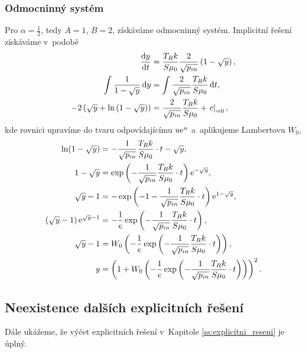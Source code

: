 \subsubsection{Odmocninný systém}\label{sss:odmocninny_system}
Pro $\alpha=\frac{1}{2}$, tedy $A=1$, $B=2$, získáváme odmocninný systém. Implicitní řešení získáváme v~podobě
\begin{subequations}
    \begin{align}
    \frac{\mathrm{d} y}{\mathrm{d} t}&=\frac{T_R k}{S \mu_0}\frac{2}{\sqrt{p_{in}}}\left(1-\sqrt{y}\right),\\
    \int\frac{1}{1-\sqrt{y}}\,\mathrm{d}{y}&=\int\frac{2}{\sqrt{p_{in}}}\frac{T_R k}{S \mu_0}\,\mathrm{d}{t},\\
    -2\left(\sqrt{y}+\ln\left(1-\sqrt{y}\right)\right)&=\frac{2}{\sqrt{p_{in}}}\frac{T_R k}{S \mu_0}+\left.c\right|_{=0},
\end{align}
\end{subequations}
kde rovnici upravíme do tvaru odpovídajícímu $u\mathrm{e}^{u}$ a~aplikujeme Lambertovu $W_0$,
\begin{subequations}
    \begin{align}
        \ln(1-\sqrt{y})&=-\frac{1}{\sqrt{p_{in}}}\frac{T_R k}{S \mu_0}\cdot t-\sqrt{y},\\
    1-\sqrt{y}&=\exp\left(-\frac{1}{\sqrt{p_{in}}}\frac{T_R k}{S \mu_0}\cdot t\right)\mathrm{e}^{-\sqrt{y}},\\
    \sqrt{y}-1&=-\exp\left(-1-\frac{1}{\sqrt{p_{in}}}\frac{T_R k}{S \mu_0}\cdot t\right)\mathrm{e}^{1-\sqrt{y}},\\
    \left(\sqrt{y}-1\right)\mathrm{e}^{\sqrt{y}-1}&=-\frac{1}{e}\exp\left(-\frac{1}{\sqrt{p_{in}}}\frac{T_R k}{S \mu_0}\cdot t\right),\\
    \sqrt{y}-1&=W_{0}\left(-\frac{1}{e}\exp\left(-\frac{1}{\sqrt{p_{in}}}\frac{T_R k}{S \mu_0}\cdot t\right)\right),\\
    y&=\left(1+W_{0}\left(-\frac{1}{e}\exp\left(-\frac{1}{\sqrt{p_{in}}}\frac{T_R k}{S \mu_0}\cdot t\right)\right)\right)^2.
\end{align}
\end{subequations}

\subsection{Neexistence dalších explicitních řešení}\label{ss:neexistence_dalsich_explicitnich_reseni}
Dále ukážeme, že výčet explicitních řešení v~Kapitole \ref{ss:explicitni_reseni} je úplný.

